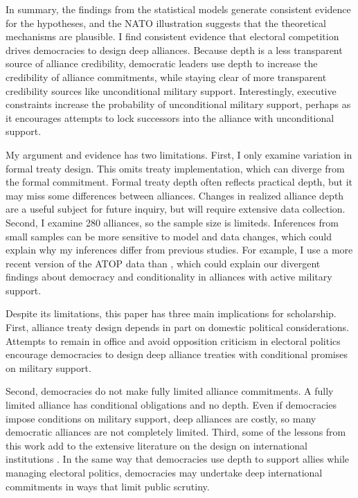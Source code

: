 \documentclass[12pt]{article}
\begin{document}
In summary, the findings from the statistical models generate consistent evidence for the hypotheses, and the NATO illustration suggests that the theoretical mechanisms are plausible. 
I find consistent evidence that electoral competition drives democracies to design deep alliances.  
Because depth is a less transparent source of alliance credibility, democratic leaders use depth to increase the credibility of alliance commitments, while staying clear of more transparent credibility sources like unconditional military support.
Interestingly, executive constraints increase the probability of unconditional military support, perhaps as it encourages attempts to lock successors into the alliance with unconditional support.


My argument and evidence has two limitations.
First, I only examine variation in formal treaty design. 
This omits treaty implementation, which can diverge from the formal commitment.   
Formal treaty depth often reflects practical depth, but it may miss some differences between alliances. 
Changes in realized alliance depth are a useful subject for future inquiry, but will require extensive data collection.
Second, I examine 280 alliances, so the sample size is limiteds. 
Inferences from small samples can be more sensitive to model and data changes, which could explain why my inferences differ from previous studies. 
For example, I use a more recent version of the ATOP data than \citet{Chibaetal2015}, which could explain our divergent findings about democracy and conditionality in alliances with active military support. 


Despite its limitations, this paper has three main implications for scholarship. 
First, alliance treaty design depends in part on domestic political considerations. 
Attempts to remain in office and avoid opposition criticism in electoral politics encourage democracies to design deep alliance treaties with conditional promises on military support. 


Second, democracies do not make fully limited alliance commitments. 
A fully limited alliance has conditional obligations and no depth.
Even if democracies impose conditions on military support, deep alliances are costly, so many democratic alliances are not completely limited.  
Third, some of the lessons from this work add to the extensive literature on the design on international institutions \citep{DownesRocke1995, MartinSimmons1998, Koremenosetal2001, Thompson2010}.
In the same way that democracies use depth to support allies while managing electoral politics, democracies may undertake deep international commitments in ways that limit public scrutiny. 
\end{document}
